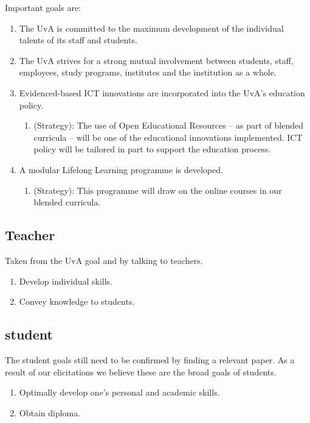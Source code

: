 Important goals are:
\begin{enumerate}
	\item The UvA is committed to the maximum development of the individual talents of its staff and students.\cite{uva_mission}
	\item The UvA strives for a strong mutual involvement between students, staff, employees, study programs, institutes and the institution as a whole.\cite{uva_mission}
	\item Evidenced-based ICT innovations are incorporated into the UvA’s education policy.\cite{uva_strategic_plan} \begin{enumerate}
		\item (Strategy): The use of Open Educational Resources – as part of blended curricula – will be one of the educational innovations implemented. ICT policy will be tailored in part to support the education process. 
	\end{enumerate}
	\item A modular Lifelong Learning programme is developed.\cite{uva_strategic_plan} \begin{enumerate}
		\item (Strategy): This programme will draw on the online
		courses in our blended curricula. 
	\end{enumerate}
\end{enumerate}

\subsection{Teacher}
Taken from the UvA goal and by talking to teachers.
\begin{enumerate}
	\item Develop individual skills.
	\item Convey knowledge to students.
\end{enumerate}

\subsection{student}
The student goals still need to be confirmed by finding a relevant paper. As a result of our elicitations we believe these are the broad goals of students.
\begin{enumerate}
	\item Optimally develop one's personal and academic skills.	
	\item Obtain diploma.
\end{enumerate}

